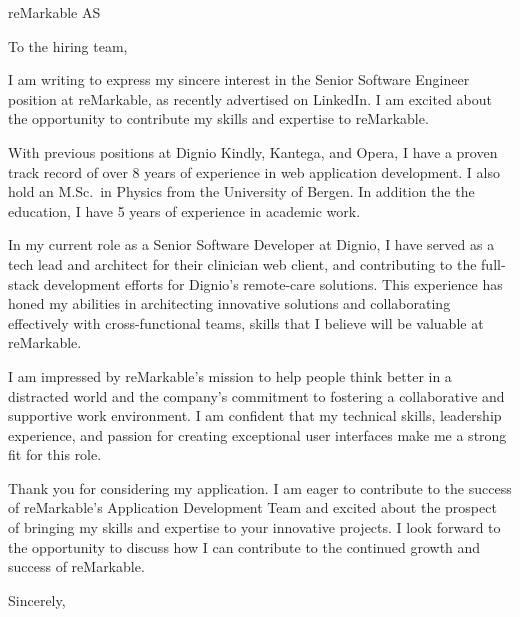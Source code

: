 \documentclass{letter}
\begin{document}
\begin{letter}{reMarkable AS}
  \opening{To the hiring team,}

  I am writing to express my sincere interest in the Senior Software Engineer
  position at reMarkable, as recently advertised on LinkedIn. I  am excited about
  the opportunity to contribute my skills and expertise to reMarkable.

  With previous positions at Dignio Kindly, Kantega, and Opera, I have a
  proven track record of over 8 years of experience in web application
  development.  I also hold an M.Sc.\ in Physics from the University of Bergen.
  In addition the the education, I have 5 years of experience in academic work.

  In my current role as a Senior Software Developer at Dignio, I have served
  as a tech lead and architect for their clinician web client, and contributing
  to the	full-stack development efforts for Dignio's remote-care solutions.
  This   experience has  honed my abilities in architecting innovative solutions
  and collaborating effectively with cross-functional teams, skills that I
  believe will be valuable at reMarkable.

  I am impressed by reMarkable's mission to help people think better in a
  distracted world and the company's commitment to fostering a collaborative  and
  supportive work environment. I am confident that my technical skills,
  leadership experience, and passion for creating exceptional user interfaces
  make me a strong fit for this role.

  Thank you for considering my application. I am eager to contribute to the
  success of reMarkable's Application Development Team and excited about the
  prospect of bringing my skills and expertise to your innovative projects. I
  look forward to the opportunity to discuss how I can contribute to the
  continued growth and success of reMarkable.

  \closing{Sincerely,}
\end{letter}
\end{document}
